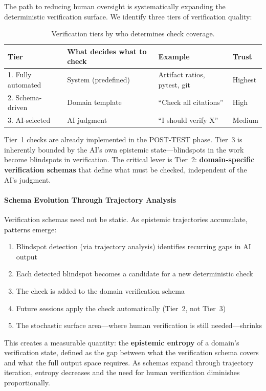 The path to reducing human oversight is systematically expanding the deterministic verification surface. We identify three tiers of verification quality:

\begin{table}[h]
\centering
\begin{tabular}{llll}
\toprule
\textbf{Tier} & \textbf{What decides what to check} & \textbf{Example} & \textbf{Trust} \\
\midrule
1. Fully automated & System (predefined) & Artifact ratios, pytest, git & Highest \\
2. Schema-driven & Domain template & ``Check all citations'' & High \\
3. AI-selected & AI judgment & ``I should verify X'' & Medium \\
\bottomrule
\end{tabular}
\caption{Verification tiers by who determines check coverage.}
\label{tab:verification-tiers}
\end{table}

Tier~1 checks are already implemented in the POST-TEST phase. Tier~3 is inherently bounded by the AI's own epistemic state---blindspots in the work become blindspots in verification. The critical lever is Tier~2: \textbf{domain-specific verification schemas} that define what must be checked, independent of the AI's judgment.

\paragraph{Schema Evolution Through Trajectory Analysis}

Verification schemas need not be static. As epistemic trajectories accumulate, patterns emerge:

\begin{enumerate}
    \item Blindspot detection (via trajectory analysis) identifies recurring gaps in AI output
    \item Each detected blindspot becomes a candidate for a new deterministic check
    \item The check is added to the domain verification schema
    \item Future sessions apply the check automatically (Tier~2, not Tier~3)
    \item The stochastic surface area---where human verification is still needed---shrinks
\end{enumerate}

This creates a measurable quantity: the \textbf{epistemic entropy} of a domain's verification state, defined as the gap between what the verification schema covers and what the full output space requires. As schemas expand through trajectory iteration, entropy decreases and the need for human verification diminishes proportionally.


